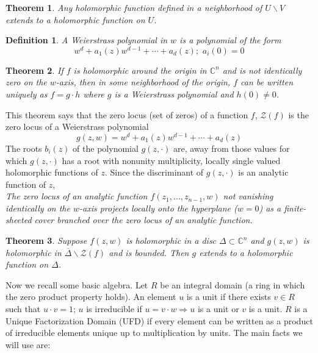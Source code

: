 \documentclass{article}
\newtheorem{thm}{Theorem}
\newtheorem{defn}{Definition}
\begin{document}
\begin{thm}

Any holomorphic function defined in a neighborhood of $U \backslash V$ extends to a holomorphic function on $U$.

\end{thm}


\begin{defn}

A Weierstrass polynomial in $w$ is a polynomial of the form
\[
	w^d + a_1(z) w^{d-1} + \cdots + a_d(z); \hspace{4pt} a_i(0)=0
\]


\end{defn}


\begin{thm}

If $f$ is holomorphic around the origin in $ \mathbb{C}^n$ and is not identically zero on the $w$-axis, then in some neighborhood of the origin, $f$ can be written uniquely as $f =g \cdot h$ where $g$ is a Weierstrass polynomial and $h(0) \neq 0$.

\end{thm}

This theorem says that the zero locus (set of zeros) of a function $f$, $ \mathcal{Z}(f)$ is the zero locus of a Weierstrass polynomial 
\[
	g(z,w) = w^d + a_1(z) w^{d-1} + \cdots + a_d(z)
\]
The roots $b_i(z)$ of the polynomial $g(z, \cdot)$ are, away from those values for which $g(z, \cdot)$ has a root with nonunity multiplicity, locally single valued holomorphic functions of $z$. Since the discriminant of $g(z, \cdot)$ is an analytic function of $z$, \\
\indent \textit{The zero locus of an analytic function $f(z_1, \ldots, z_{n-1},w)$ not vanishing identically on the $w$-axis projects locally onto the hyperplane ($w=0$) as a finite-sheeted cover branched over the zero locus of an analytic function.}


\begin{thm}

	Suppose $f(z,w)$ is holomorphic in a disc $\Delta \subset \mathbb{C}^n$ and $g(z,w)$ is holomorphic in $\overline{\Delta} \backslash \mathcal{Z}(f)$ and is bounded. Then $g$ extends to a holomorphic function on $\Delta$.

\end{thm}

Now we recall some basic algebra. Let $R$ be an integral domain (a ring in which the zero product property holds). An element $u$ is a unit if there exists $v \in R$ such that $u \cdot v = 1$; $u$ is irreducible if $ u = v \cdot w \Rightarrow u$ is a unit or $v$ is a unit. $R$ is a Unique Factorization Domain (UFD) if every element can be written as a product of irreducible elements unique up to multiplication by units. The main facts we will use are:
\end{document}
